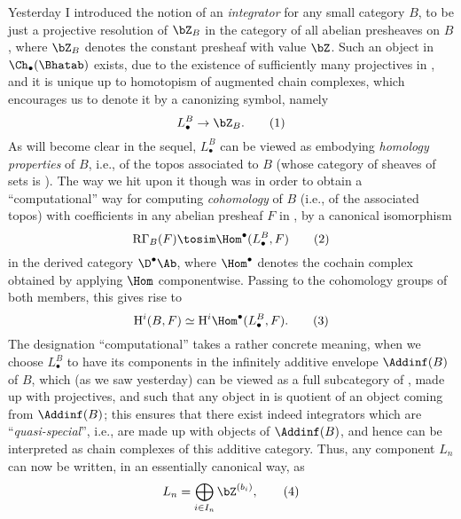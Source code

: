 \presectionfill{}\par

\label{sec:100}%
Yesterday I introduced the notion of an \emph{integrator} for any
small category $B$, to be just a projective resolution of $\bZ_B$ in
the category \Bhatab{} of all abelian presheaves on $B$, where $\bZ_B$
denotes the constant presheaf with value $\bZ$. Such an object in
$\Ch_\bullet(\Bhatab)$ exists, due to the existence of sufficiently
many projectives in \Bhatab, and it is unique up to homotopism of
augmented chain complexes, which encourages us to denote it by a
canonizing symbol, namely
\begin{equation}
  \label{eq:100.1}
  L_\bullet^B\to \bZ_B.\tag{1}
\end{equation}
As will become clear in the sequel, $L_\bullet^B$ can be viewed as
embodying \emph{homology properties} of $B$, i.e., of the topos
associated to $B$ (whose category of sheaves of sets is \Bhat). The
way we hit upon it though was in order to obtain a ``computational''
way for computing \emph{cohomology} of $B$ (i.e., of the associated
topos) with coefficients in any abelian presheaf $F$ in \Bhatab, by a
canonical isomorphism
\begin{equation}
  \label{eq:100.2}
  \mathrm R \Gamma_B(F) \tosim \Hom^\bullet(L_\bullet^B,F)\tag{2}
\end{equation}
in the derived category $\D^\bullet\Ab$, where $\Hom^\bullet$ denotes
the cochain complex obtained by applying $\Hom$ componentwise. Passing
to the cohomology groups of both members, this gives rise to
\begin{equation}
  \label{eq:100.3}
  \mathrm H^i(B,F) \simeq \mathrm H^i \Hom^\bullet(L_\bullet^B,F).\tag{3}
\end{equation}
The designation ``computational'' takes a rather concrete meaning,
when we choose $L_\bullet^B$ to have its components in the infinitely
additive envelope $\Addinf(B)$ of $B$, which (as we saw yesterday) can
be viewed as a full subcategory of \Bhatab, made up with projectives,
and such that any object in \Bhat{} is quotient of an object coming
from $\Addinf(B)$; this ensures that there exist indeed integrators
which are ``\emph{quasi-special}'', i.e., are made up with objects of
$\Addinf(B)$, and hence can be interpreted as chain complexes of this
additive category. Thus, any component $L_n$ can now be written, in an
essentially canonical way, as
\begin{equation}
  \label{eq:100.4}
  L_n = \bigoplus_{i\in I_n} \bZ^{(b_i)} ,\tag{4}
\end{equation}
